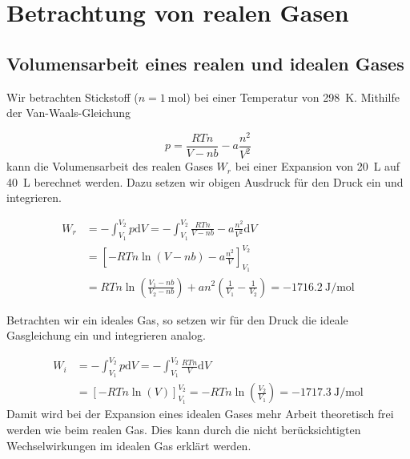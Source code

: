 \section{Betrachtung von realen Gasen}

  \subsection{Volumensarbeit eines realen und idealen Gases}
  
    Wir betrachten Stickstoff ($n = \SI[mode=text]{1}{\mole}$) bei einer Temperatur von \SI[mode=text]{298}{\kelvin}. Mithilfe der Van-Waals-Gleichung
    
    \begin{equation}
      p = \frac{RTn}{V - nb} - a \frac{n^2}{V^2}
    \end{equation}
    kann die Volumensarbeit des realen Gases $W_r$ bei einer Expansion von \SI[mode=text]{20}{\liter} auf \SI[mode=text]{40}{\liter} berechnet werden. Dazu setzen wir obigen Ausdruck für den Druck ein und integrieren.
    
    \begin{equation}
      \begin{split}
        W_r &= - \int_{V_1}^{V_2} p \text{d}V = - \int_{V_1}^{V_2} \frac{RTn}{V - nb} - a \frac{n^2}{V^2} \text{d} V\\
          &= \left[ - RTn \ln(V-nb) - a \frac{n^2}{V} \right]_{V_1}^{V_2} \\
          &= RTn \ln\left(\frac{V_1 - nb}{V_2 - nb}\right) + a n^2 \left(\frac{1}{V_1} - \frac{1}{V_2}\right) = \SI[mode=text]{-1716.2}{\joule\per\mole}
      \end{split}
    \end{equation}
    
    Betrachten wir ein ideales Gas, so setzen wir für den Druck die ideale Gasgleichung ein und integrieren analog.
    
    \begin{equation}
      \begin{split}
        W_i &= - \int_{V_1}^{V_2} p \text{d} V = - \int_{V_1}^{V_2} \frac{RTn}{V} \text{d} V \\
          &= \left[-RTn \ln(V)\right]_{V_1}^{V_2} = -RTn\ln\left(\frac{V_2}{V_1}\right) = \SI[mode=text]{-1717.3}{\joule\per\mole}
      \end{split}
    \end{equation}
    Damit wird bei der Expansion eines idealen Gases mehr Arbeit theoretisch frei werden wie beim realen Gas. Dies kann durch die nicht berücksichtigten Wechselwirkungen im idealen Gas erklärt werden.